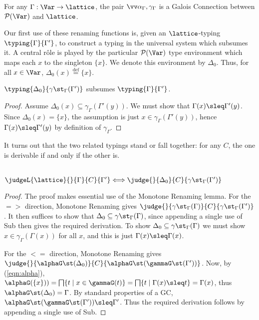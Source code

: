 \documentclass{sigplanconf}
\newcommand{\pset}{\mathcal{P}}
\newcommand{\eqdef}{\mathrel{\stackrel{{\scriptscriptstyle\mathrm{def}}}{=}}}
\newcommand{\Set}[1]{ \{ #1 \} }
\newcommand{\SetDef}[2]{ \{ #1 \; | \; #2 \} }
\begin{document}
\begin{lemma}
        For any $\Gamma: \Var \rightarrow \lattice$, the pair
        $\vect{\alpha_\Gamma,\gamma_\Gamma}$ is a Galois Connection between $\pset(\Var)$ and $\lattice$.
\end{lemma}
Our first use of these renaming functions is, given
an $\lattice$-typing $\typing{\Gamma}{\Gamma'}$, to construct a 
typing in the universal system
which subsumes it.
A central r\^{o}le is played by the particular $\pset(\Var)$ type environment
which maps each $x$ to the singleton $\Set{x}$.
We denote this environment by $\Delta_0$.
Thus, for all
$x \in \Var$,
\(
        \Delta_0(x) \eqdef \Set{x}
\).
\begin{lemma}\label{lemma:shift}
    $\typing{\Delta_0}{\gamma\st_\Gamma(\Gamma')}$
    subsumes 
    $\typing{\Gamma}{\Gamma'}$.
\end{lemma}
\begin{proof}
    Assume $\Delta_0(x) \subseteq \gamma_\Gamma(\Gamma'(y))$.
    We must show that $\Gamma(x) \sleq \Gamma'(y)$.
    Since $\Delta_0(x) = \Set{x}$, the assumption
    is just $x \in \gamma_\Gamma(\Gamma'(y))$,
    hence $\Gamma(x) \sleq \Gamma'(y)$ by definition of $\gamma_\Gamma$.
\end{proof}
It turns out that the two related typings stand or fall together: for any $C$, the
one is derivable if and only if the other is.
\begin{lemma}\label{lemma:canonical}
\mbox{} \\
$
\judgeL{\lattice}{}{\Gamma}{C}{\Gamma'}
<=>
\judge{}{\Delta_0}{C}{\gamma\st_\Gamma(\Gamma')}
$
\end{lemma}
\begin{proof}
The proof makes essential use of the Monotone Renaming lemma.
For the $=>$ direction, Monotone Renaming gives
$\judge{}{\gamma\st_\Gamma(\Gamma)}{C}{\gamma\st_\Gamma(\Gamma')}$.
It then suffices to show that $\Delta_0 \subseteq \gamma\st_\Gamma(\Gamma)$,
since appending a single use of Sub then gives the required derivation.
To show $\Delta_0 \subseteq \gamma\st_\Gamma(\Gamma)$ we must show
$x \in \gamma_\Gamma(\Gamma(x))$ for all $x$, and this is
just $\Gamma(x) \sleq \Gamma(x)$.

For the $<=$ direction, Monotone Renaming gives
$\judge{}{\alphaG\st(\Delta_0)}{C}{\alphaG\st(\gammaG\st(\Gamma'))}$.
Now, by (\ref{eqn:alpha}),
$
\alphaG(\Set{x}))
= \bigsqcap\SetDef{t}{x \in \gammaG(t)}
= \bigsqcap\SetDef{t}{\Gamma(x) \sleq t}
= \Gamma(x)
$,
thus
$\alphaG\st(\Delta_0) = \Gamma$.
By standard properties of a GC, $\alphaG\st(\gammaG\st(\Gamma')) \sleq \Gamma'$.
Thus the required derivation follows by appending a single use of Sub.
\end{proof}
\end{document}
